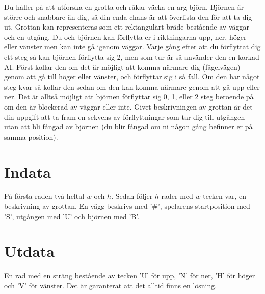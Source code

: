 Du håller på att utforska en grotta och råkar väcka en arg björn. Björnen är större och snabbare än dig, så din enda chans är att överlista den för att ta dig ut. Grottan kan representeras som ett rektangulärt bräde bestående av väggar och en utgång. Du och björnen kan förflytta er i riktningarna upp, ner, höger eller vänster men kan inte gå igenom väggar. Varje gång efter att du förflyttat dig ett steg så kan björnen förflytta sig 2, men som tur är så använder den en korkad AI. Först kollar den om det är möjligt att komma närmare dig (fågelvägen) genom att gå till höger eller vänster, och förflyttar sig i så fall. Om den har något steg kvar så kollar den sedan om den kan komma närmare genom att gå upp eller ner. Det är alltså möjligt att björnen förflyttar sig 0, 1, eller 2 steg beroende på om den är blockerad av väggar eller inte. Givet beskrivningen av grottan är det din uppgift att ta fram en sekvens av förflyttningar som tar dig till utgången utan att bli fångad av björnen (du blir fångad om ni någon gång befinner er på samma position).

\section*{Indata}
På första raden två heltal $w$ och $h$. Sedan följer $h$ rader med $w$ tecken var, en beskrivning av grottan. En vägg beskrivs med '\#', spelarens startposition med 'S', utgången med 'U' och björnen med 'B'.

\section*{Utdata}
En rad med en sträng bestående av tecken 'U' för upp, 'N' för ner, 'H' för höger och 'V' för vänster. Det är garanterat att det alltid finns en lösning.
